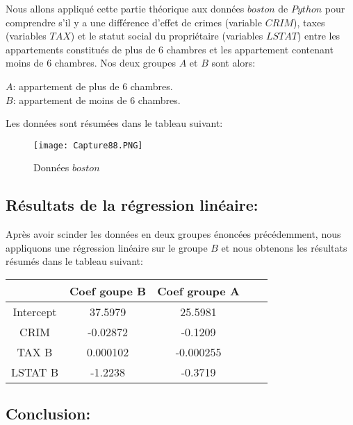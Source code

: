 \documentclass{article}
\begin{document}
\vspace{0.2cm}

Nous allons appliqué cette partie théorique aux données $boston$ de $Python$ pour comprendre s'il y a une différence d'effet de crimes (variable $CRIM$), taxes (variables $TAX$) et le statut social du propriétaire (variables $LSTAT$) entre les appartements constitués de plus de 6 chambres et les appartement contenant moins de 6 chambres. Nos deux groupes $A$ et $B$ sont alors:

\vspace{0.2cm}
$A$: appartement de plus de $6$ chambres.\\
$B$: appartement de moins de $6$ chambres.

\newpage

Les données sont résumées dans le tableau suivant:
\begin{figure}[htbp]
    \centering
    \texttt{[image: Capture88.PNG]}
    \caption{Données $boston$}
    \label{fig:my_label}
\end{figure}

\subsection{Résultats de la régression linéaire:}
Après avoir scinder les données en deux groupes énoncées précédemment, nous appliquons une régression linéaire sur le groupe $B$ et nous obtenons les résultats résumés dans le tableau suivant:
\begin{center}
    \begin{tabular}{|c|c|c|c|c|}
    \hline
         & Coef goupe B & Coef groupe A    \\
         \hline 
         Intercept  & 37.5979 & 25.5981 \\
         CRIM  & -0.02872 & -0.1209\\
         TAX B & 0.000102 & -0.000255 \\
         LSTAT B & -1.2238   & -0.3719\\
         
         \hline
    \end{tabular}
\end{center} 


\subsection{Conclusion:}
\end{document}
